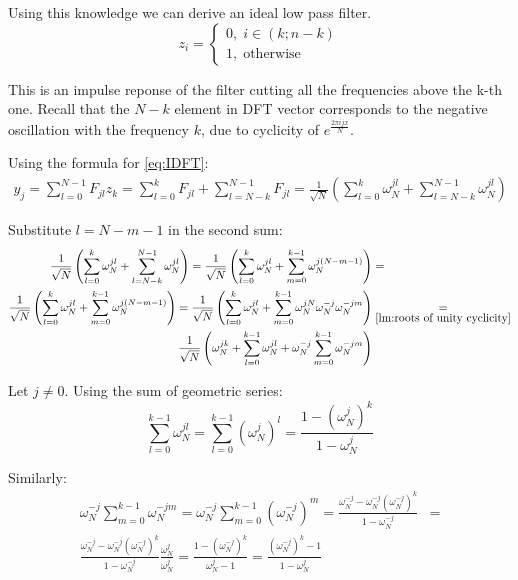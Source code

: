 Using this knowledge we can derive an ideal low pass filter.
\[z_i = \begin{cases} 0, \;i \in (k;n-k) \\ 1, \; \text{otherwise} \end{cases}\]

This is an impulse reponse of the filter cutting all the frequencies above the k-th one. Recall that the $N-k$ element in DFT vector corresponds to the negative oscillation with the frequency $k$, due to cyclicity of $e^{\frac{2\pi i j x}{N}}$.

Using the formula for \ref{eq:IDFT}:
\[\begin{aligned}
		y_{j} = \sum_{l=0}^{N-1} F_{jl} z_k
		= \sum_{l=0}^{k} F_{jl} + \sum_{l=N-k}^{N-1} F_{jl}
		= \frac{1}{\sqrt{N}} \left(\sum_{l=0}^{k} \omega_N^{jl} + \sum_{l=N-k}^{N-1} \omega_N^{jl} \right)
	\end{aligned}\]

Substitute $l = N-m-1$ in the second sum:
\[\begin{aligned}
		\frac{1}{\sqrt{N}} \left(\sum_{l=0}^{k} \omega_N^{jl} + \sum_{l=N-k}^{N-1} \omega_N^{jl} \right) =
		\frac{1}{\sqrt{N}} \left(\sum_{l=0}^{k} \omega_N^{jl} + \sum_{m=0}^{k-1} \omega_N^{j(N-m-1)} \right)
		 & =                                               \\ \frac{1}{\sqrt{N}} \left(\sum_{l=0}^{k} \omega_N^{jl} + \sum_{m=0}^{k-1} \omega_N^{j(N-m-1)} \right)
		=\frac{1}{\sqrt{N}} \left(\sum_{l=0}^{k} \omega_N^{jl} + \sum_{m=0}^{k-1} \omega_N^{jN} \omega_N^{-j} \omega_N^{-jm} \right)
		 & \underset{\ref{lm:roots of unity cyclicity}}{=} \\ \frac{1}{\sqrt{N}} \left(\omega_N^{jk} + \sum_{l=0}^{k-1} \omega_N^{jl} + \omega_N^{-j} \sum_{m=0}^{k-1} \omega_N^{-jm} \right)
	\end{aligned}\]

Let $j\neq 0$. Using the sum of geometric series:
\[\sum_{l=0}^{k-1} \omega_N^{jl} = \sum_{l=0}^{k-1} {\left(\omega_N^{j}\right)}^l = \frac{1 - {\left(\omega_N^{j}\right)}^k}{1 - \omega_N^j}\]

Similarly:
\[\begin{aligned}
		\omega_N^{-j}\sum_{m=0}^{k-1} \omega_N^{-jm}
		= \omega_N^{-j}\sum_{m=0}^{k-1} {\left(\omega_N^{-j}\right)}^m
		= \frac{\omega_N^{-j} - \omega_N^{-j}{\left(\omega_N^{-j}\right)}^k}{1 - \omega_N^{-j}}
		 & = \\ \frac{\omega_N^{-j} - \omega_N^{-j}{\left(\omega_N^{-j}\right)}^k}{1 - \omega_N^{-j}} \frac{\omega_N^j}{\omega_N^j}
		= \frac{1 - {\left(\omega_N^{-j}\right)}^k}{\omega_N^{j} - 1}
		= \frac{{\left(\omega_N^{-j}\right)}^k - 1}{1 - \omega_N^{j}}
	\end{aligned}\]

